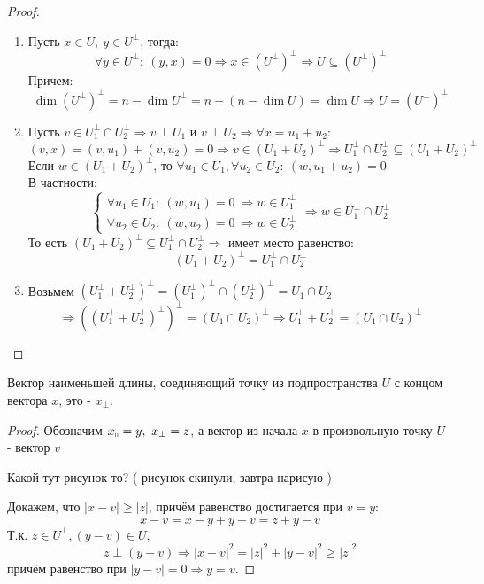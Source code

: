 \begin{proof}\tab
    \begin{enumerate}
        \item Пусть $x\in U,\ y\in U^\perp$, тогда: 
        $$\forall y\in U^\perp: \ (y,x)=0 \Longrightarrow  x\in (U^\perp)^\perp \Longrightarrow  U\subseteq (U^\perp)^\perp$$ 
        Причем: 
        $$\dim{(U^\perp)^\perp}=n-\dim{U^\perp}=n-(n-\dim{U})=\dim{U}\Longrightarrow  U=(U^\perp)^\perp$$

        \item Пусть $v\in U_1^\perp\cap U_2^\perp \Longrightarrow  v\perp U_1$ и $v\perp U_2 \Longrightarrow  \forall x=u_1+u_2$:
        $$(v,x)=(v,u_1)+(v,u_2)=0 \Longrightarrow  v\in (U_1+U_2)^\perp \Longrightarrow  U_1^\perp \cap U_2^\perp \subseteq (U_1+U_2)^\perp$$
        Если $w\in (U_1+U_2)^\perp$, то $\forall u_1\in U_1, \forall u_2\in U_2 :\ (w, u_1+u_2)=0$\\
        В частности: 
        $$\begin{cases}
            \forall u_1\in U_1: \ (w, u_1)=0 \ \Longrightarrow  w\in U_1^\perp\\
            \forall u_2\in U_2: \ (w, u_2)=0 \ \Longrightarrow  w\in U_2^\perp
        \end{cases} \Longrightarrow  w\in U_1^\perp\cap U_2^\perp$$
        То есть $(U_1+U_2)^\perp \subseteq U_1^\perp \cap U_2^\perp \Longrightarrow $ имеет место равенство:
        $$(U_1+U_2)^\perp=U_1^\perp\cap U_2^\perp$$

        \item Возьмем $(U_1^\perp+U_2^\perp)^\perp=(U_1^\perp)^\perp \cap (U_2^\perp)^\perp=U_1 \cap U_2$
        $$\Longrightarrow  ((U_1^\perp+U_2^\perp)^\perp)^\perp=(U_1\cap U_2)^\perp \Longrightarrow  U_1^\perp+U_2^\perp=(U_1 \cap U_2)^\perp$$
    \end{enumerate}
\end{proof}
\begin{subtheorem}
    Вектор наименьшей длины, соединяющий точку из подпространства $U$ с концом вектора $x$, это - $x_{\perp}$. 
\end{subtheorem}
\begin{proof}
    Обозначим $x_{\shortparallel} = y, \ x_{\perp} = z$, а вектор из начала $x$ в произвольную точку $U$ - вектор $v$
    \begin{center}
        Какой тут рисунок то? ( рисунок скинули, завтра нарисую )
    \end{center}
    Докажем, что $|x-v|\geqslant |z|$, причём равенство достигается при $v = y$:
    $$x - v = x - y + y - v = z + y - v$$
    Т.к. $z \in U^{\perp}, (y - v) \in U$,
    $$z \perp (y-v) \Longrightarrow |x-v|^2 = |z|^2 + |y-v|^2 \geqslant |z|^2$$
    причём равенство при $|y - v| = 0 \Longrightarrow y = v$.
\end{proof}
